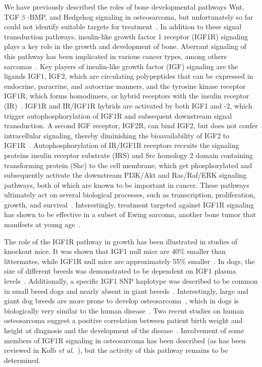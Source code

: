 We have previously described the roles of bone developmental pathways Wnt, TGF$\upbeta$\hyp{}BMP, and Hedgehog signaling in osteosarcoma, but unfortunately so far could not identify suitable targets for treatment~\cite{cai2010inactive,mohseny2012activities}. In addition to these signal transduction pathways, insulin\hyp{}like growth factor 1 receptor (IGF1R) signaling plays a key role in the growth and development of bone. Aberrant signaling of this pathway has been implicated in various cancer types, among others sarcomas~\cite{rikhof2009insulin,maki2010small}. Key players of insulin\hyp{}like growth factor (IGF) signaling are the ligands IGF1, IGF2, which are circulating polypeptides that can be expressed in endocrine, paracrine, and autocrine manners, and the tyrosine kinase receptor IGF1R, which forms homodimers, or hybrid receptors with the insulin receptor (IR)~\cite{pollak2012insulin}. IGF1R and IR/IGF1R hybrids are activated by both IGF1 and -2, which trigger autophosphorylation of IGF1R and subsequent downstream signal transduction. A second IGF receptor, IGF2R, can bind IGF2, but does not confer intracellular signaling, thereby diminishing the bioavailability of IGF2 to IGF1R~\cite{siddle2012molecular}. Autophosphorylation of IR/IGF1R receptors recruits the signaling proteins insulin receptor substrate (IRS) and Src homology 2 domain containing transforming protein (Shc) to the cell membrane, which get phosphorylated and subsequently activate the downstream PI3K/Akt and Ras/Raf/ERK signaling pathways, both of which are known to be important in cancer. These pathways ultimately act on several biological processes, such as transcription, proliferation, growth, and survival~\cite{siddle2012molecular,foulstone2005insulin,siddle2011signalling}. Interestingly, treatment targeted against IGF1R signaling has shown to be effective in a subset of Ewing sarcoma, another bone tumor that manifests at young age~\cite{subbiah2010targeted}.

The role of the IGF1R pathway in growth has been illustrated in studies of knockout mice. It was shown that IGF1 null mice are 40\% smaller than littermates, while IGF1R null mice are approximately 55\% smaller~\cite{liu1993mice}. In dogs, the size of different breeds was demonstrated to be dependent on IGF1 plasma levels~\cite{maki2010small}. Additionally, a specific IGF1 SNP haplotype was described to be common in small breed dogs and nearly absent in giant breeds~\cite{sutter2007single}. Interestingly, large and giant dog breeds are more prone to develop osteosarcoma~\cite{selvarajah2010prognostic}, which in dogs is biologically very similar to the human disease~\cite{kirpensteijn2008tp53}. Two recent studies on human osteosarcoma suggest a positive correlation between patient birth weight and height at diagnosis and the development of the disease~\cite{arora2011relationship,mirabello2011height}. Involvement of some members of IGF1R signaling in osteosarcoma has been described (as has been reviewed in Kolb {\it et al}.~\cite{kolb2009development}), but the activity of this pathway remains to be determined.

